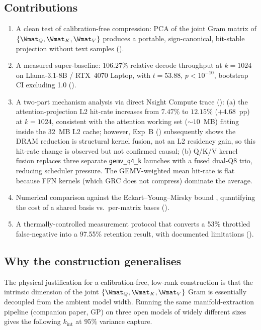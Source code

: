 \documentclass[11pt]{article}
\begin{document}
\subsection{Contributions}
\begin{enumerate}
\item A clean test of calibration-free compression: PCA of the joint Gram
matrix of $\{\Wmat_Q,\Wmat_K,\Wmat_V\}$ produces a portable, sign-canonical,
bit-stable projection without text samples ().
\item A measured super-baseline: $106.27\%$ relative decode throughput
at $k{=}1024$ on Llama-3.1-8B / RTX~4070 Laptop, with $t{=}53.88$,
$p<10^{-10}$, bootstrap CI excluding 1.0 ().
\item A two-part mechanism analysis via direct Nsight Compute trace ():
(a) the attention-projection L2 hit-rate increases from $7.47\%$ to $12.15\%$
($+4.68$~pp) at $k{=}1024$, consistent with the attention working set ($\sim 10$~MB)
fitting inside the $32$~MB L2 cache; however, Exp~B ()
subsequently shows the DRAM reduction is structural kernel fusion, not an L2
residency gain, so this hit-rate change is observed but not confirmed causal;
(b) Q/K/V kernel fusion replaces three separate \texttt{gemv\_q4\_k} launches with a fused dual-Q8
trio, reducing scheduler pressure. The GEMV-weighted mean hit-rate is flat
because FFN kernels (which GRC does not compress) dominate the average.
\item Numerical comparison against the Eckart--Young--Mirsky bound
\cite{eckart1936}, quantifying the cost of a shared basis vs.\ per-matrix
bases ().
\item A thermally-controlled measurement protocol that converts a 53\%
throttled false-negative into a 97.55\% retention result, with
documented limitations ().
\end{enumerate}
\subsection{Why the construction generalises}
\label{sec:intrinsic-dim}
The physical justification for a calibration-free, low-rank construction is
that the intrinsic dimension of the joint $\{\Wmat_Q,\Wmat_K,\Wmat_V\}$ Gram
is essentially decoupled from the ambient model width. Running the same
manifold-extraction pipeline (companion paper, GP) on three open models of
widely different sizes gives the following $k_{\mathrm{int}}$ at $95\%$
variance capture.
\end{document}
